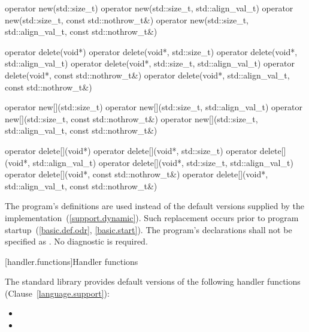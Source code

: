 %
%
\begin{codeblock}
operator new(std::size_t)
operator new(std::size_t, std::align_val_t)
operator new(std::size_t, const std::nothrow_t&)
operator new(std::size_t, std::align_val_t, const std::nothrow_t&)
\end{codeblock}%
%
%
\begin{codeblock}
operator delete(void*)
operator delete(void*, std::size_t)
operator delete(void*, std::align_val_t)
operator delete(void*, std::size_t, std::align_val_t)
operator delete(void*, const std::nothrow_t&)
operator delete(void*, std::align_val_t, const std::nothrow_t&)
\end{codeblock}%
%
%
\begin{codeblock}
operator new[](std::size_t)
operator new[](std::size_t, std::align_val_t)
operator new[](std::size_t, const std::nothrow_t&)
operator new[](std::size_t, std::align_val_t, const std::nothrow_t&)
\end{codeblock}%
%
%
\begin{codeblock}
operator delete[](void*)
operator delete[](void*, std::size_t)
operator delete[](void*, std::align_val_t)
operator delete[](void*, std::size_t, std::align_val_t)
operator delete[](void*, const std::nothrow_t&)
operator delete[](void*, std::align_val_t, const std::nothrow_t&)
\end{codeblock}

\pnum
The program's definitions are used instead of the default versions supplied by
the implementation~(\ref{support.dynamic}).
Such replacement occurs prior to program startup~(\ref{basic.def.odr}, \ref{basic.start}).
%
The program's declarations shall not be specified as
.
No diagnostic is required.

[handler.functions]{Handler functions}

\pnum
The \Cpp standard library provides default versions of the following handler
functions (Clause~\ref{language.support}):

\begin{itemize}
\item
{}
%
\item
{}
%
\end{itemize}

